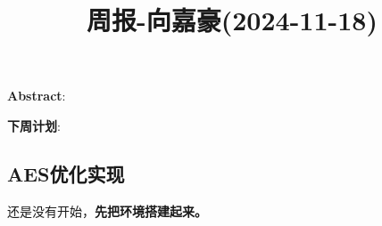 \documentclass[11pt,a4paper]{article}
\title{周报-向嘉豪(2024-11-18)}
\renewcommand{\maketitle}{
  \begin{center}
    \LARGE\bfseries\thetitle
  \end{center}
}
\begin{document}
\maketitle


\noindent \textbf{Abstract}: 

\noindent \textbf{下周计划}: 

\subsection{AES优化实现}

还是没有开始，\textbf{先把环境搭建起来。}

% 
% 
\end{document}

